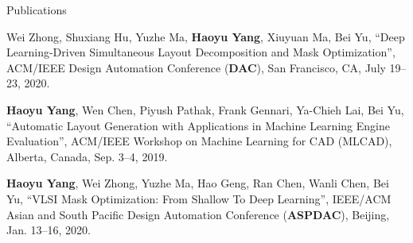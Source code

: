 \begin{rSection}{Publications}
\begin{description}[font=\normalfont]
	\item[{[C15]}] Wei Zhong, Shuxiang Hu, Yuzhe Ma, \textbf{Haoyu Yang}, Xiuyuan Ma, Bei Yu, 
	``Deep Learning-Driven Simultaneous Layout Decomposition and Mask Optimization'', 
	ACM/IEEE Design Automation Conference (\textbf{DAC}), San Francisco, CA, July 19–23, 2020.
	
	\item[{[C14]}] \textbf{Haoyu Yang}, Wen Chen, Piyush Pathak, Frank Gennari, Ya-Chieh Lai, Bei Yu, 
	``Automatic Layout Generation with Applications in Machine Learning Engine Evaluation'', 
	ACM/IEEE Workshop on Machine Learning for CAD (MLCAD), Alberta, Canada, Sep. 3–4, 2019.
	
	
	\item[{[C13]}] \textbf{Haoyu Yang}, Wei Zhong, Yuzhe Ma, Hao Geng, Ran Chen, Wanli Chen, Bei Yu,
	 ``VLSI Mask Optimization: From Shallow To Deep Learning'', 
	 IEEE/ACM Asian and South Pacific Design Automation Conference (\textbf{ASPDAC}), Beijing, Jan. 13–16, 2020.


\end{description}
\end{rSection}
